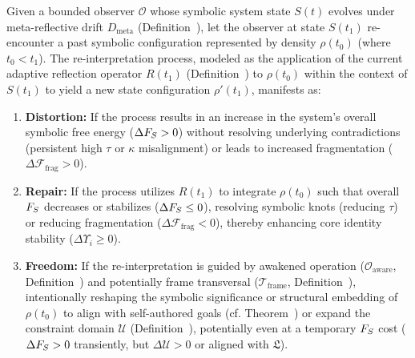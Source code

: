 \begin{proposition}
\label{prop:bk9__modes_of_re_interpretation}
Given a bounded observer $\mathcal{O}$ whose symbolic system state $S(t)$ evolves under meta-reflective drift $D_{\text{meta}}$ (Definition~), let the observer at state $S(t_1)$ re-encounter a past symbolic configuration represented by density $\rho(t_0)$ (where $t_0 < t_1$). The re-interpretation process, modeled as the application of the current adaptive reflection operator $R(t_1)$ (Definition~) to $\rho(t_0)$ within the context of $S(t_1)$ to yield a new state configuration $\rho'(t_1)$, manifests as:
\begin{enumerate}
    \item \textbf{Distortion:} If the process results in an increase in the system's overall symbolic free energy ($\Delta F_S > 0$) without resolving underlying contradictions (persistent high $\tau$ or $\kappa$ misalignment) or leads to increased fragmentation ($\Delta \mathcal{F}_{\text{frag}} > 0$).
    \item \textbf{Repair:} If the process utilizes $R(t_1)$ to integrate $\rho(t_0)$ such that overall $F_S$ decreases or stabilizes ($\Delta F_S \le 0$), resolving symbolic knots (reducing $\tau$) or reducing fragmentation ($\Delta \mathcal{F}_{\text{frag}} < 0$), thereby enhancing core identity stability ($\Delta \Upsilon_i \ge 0$).
    \item \textbf{Freedom:} If the re-interpretation is guided by awakened operation ($\mathcal{O}_{\text{aware}}$, Definition~) and potentially frame transversal ($\mathcal{T}_{\text{frame}}$, Definition~), intentionally reshaping the symbolic significance or structural embedding of $\rho(t_0)$ to align with self-authored goals (cf. Theorem~) or expand the constraint domain $\mathcal{U}$ (Definition~), potentially even at a temporary $F_S$ cost ($\Delta F_S > 0$ transiently, but $\Delta \mathcal{U} > 0$ or aligned with $\mathfrak{L}$).
\end{enumerate}
\end{proposition}
